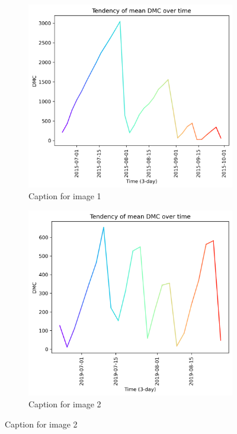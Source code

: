 \begin{figure}[h]
	\caption{HELLo}
	\centering
	\begin{subfigure}{0.49\textwidth}
		\centering
		\includegraphics[width=\textwidth]{graphs/2015/tendency/2015_tendency_graph_DMC.png}
		\caption{Caption for image 1}
		\label{fig:img1}
	\end{subfigure}
	\hfill
	\begin{subfigure}{0.49\textwidth}
		\centering
		\includegraphics[width=\textwidth]{graphs/2019/tendency/2019_tendency_graph_DMC.png}
		\caption{Caption for image 2}
		\label{fig:img2}
	\end{subfigure}
	\label{fig:both_images}
\end{figure}

